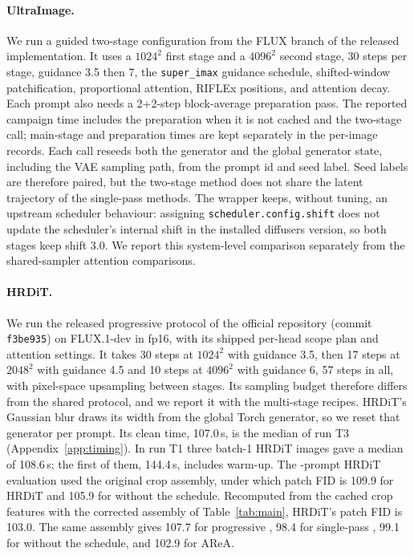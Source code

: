 \paragraph{UltraImage.} We run a guided two-stage configuration from the FLUX branch of the released implementation. It uses a $1024^2$ first stage and a $4096^2$ second stage, 30 steps per stage, guidance 3.5 then 7, the \texttt{super\_imax} guidance schedule, shifted-window patchification, proportional attention, RIFLEx positions, and attention decay. Each prompt also needs a 2+2-step block-average preparation pass. The reported campaign time includes the preparation when it is not cached and the two-stage call; main-stage and preparation times are kept separately in the per-image records. Each call reseeds both the generator and the global generator state, including the VAE sampling path, from the prompt id and seed label. Seed labels are therefore paired, but the two-stage method does not share the latent trajectory of the single-pass methods. The wrapper keeps, without tuning, an upstream scheduler behaviour: assigning \texttt{scheduler.config.shift} does not update the scheduler's internal shift in the installed diffusers version, so both stages keep shift 3.0. We report this system-level comparison separately from the shared-sampler attention comparisons.

\paragraph{HRDiT.} We run the released progressive protocol of the official repository (commit \texttt{f3be935}) on FLUX.1-dev in fp16, with its shipped per-head scope plan and attention settings. It takes 30 steps at $1024^2$ with guidance 3.5, then 17 steps at $2048^2$ with guidance 4.5 and 10 steps at $4096^2$ with guidance 6, 57 steps in all, with pixel-space upsampling between stages. Its sampling budget therefore differs from the shared protocol, and we report it with the multi-stage recipes. HRDiT's Gaussian blur draws its width from the global Torch generator, so we reset that generator per prompt. Its clean time, 107.0\,s, is the median of run T3 (Appendix~\ref{app:timing}). In run T1 three batch-1 HRDiT images gave a median of 108.6\,s; the first of them, 144.4\,s, includes warm-up. The \nmain-prompt HRDiT evaluation used the original crop assembly, under which patch FID is 109.9 for HRDiT and 105.9 for \sca{} without the schedule. Recomputed from the cached crop features with the corrected assembly of Table~\ref{tab:main}, HRDiT's patch FID is 103.0. The same assembly gives 107.7 for progressive \sca{}, 98.4 for single-pass \sca{}, 99.1 for \sca{} without the schedule, and 102.9 for AReA.

